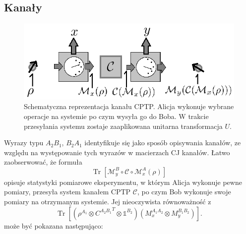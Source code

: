 \documentclass[10pt]{article} %
\DeclareMathOperator{\Trs}{Tr}
\newcommand{\I}{\mathbb{1}}
\begin{document}
\subsection{Kanały}
\begin{figure}[h]
\centering
\includegraphics{obrazki/channel_new}
\caption{Schematyczna reprezentacja kanału CPTP. Alicja wykonuje wybrane operacje na systemie po czym wysyła go do Boba. W trakcie przesyłania systemu zostaje zaaplikowana unitarna transformacja $U$.}
\end{figure}
Wyrazy typu $A_2B_1$, $B_2A_1$ identyfikuje się jako sposób opisywania kanałów, ze względu na występowanie tych wyrazów w macierzach CJ kanałów.
Łatwo zaobserwować, że formuła
\begin{equation}
\Trs \left[ \mathcal{M}_y^B \circ \mathcal{C} \circ \mathcal{M}_x^A(\rho)\right]
\end{equation} opisuje statystyki pomiarowe eksperymentu, w którym Alicja wykonuje pewne pomiary, przesyła system kanałem CPTP $\mathcal{C}$, po czym Bob wykonuje swoje pomiary na otrzymanym systemie. Jej nieoczywista równoważność z 
\begin{equation}
\Trs \left[\left( \rho^{A_1}\otimes  {C^{A_2B_1}}^T \otimes \I^{B_2}\right)(M_x^{A_1A_2}\otimes M_y^{B_1B_2})\right].
\end{equation} może być pokazana następująco: 
\end{document}
